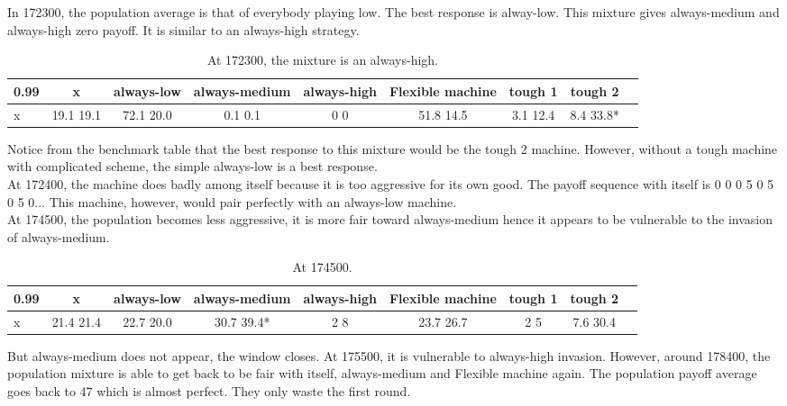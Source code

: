 \documentclass[12.5pt]{report}
\begin{document}
In 172300, the population average is that of everybody playing low. The best response is alway-low. This mixture gives always-medium and always-high zero payoff. It is similar to an always-high strategy. 


\begin{table}[h!]
\center
\begin{tabular}{l|cccccccc}
\textbf{0.99}& x & always-low & always-medium & always-high & Flexible machine &tough 1 & tough 2\\
\hline
x& 19.1 19.1  &    72.1 20.0    &   0.1 0.1  &        0 0   &      51.8 14.5   &   3.1 12.4  &     8.4 33.8* \\
\end{tabular}
\caption{At 172300, the mixture is an always-high.}
\end{table}

Notice from the benchmark table that the best response to this mixture would be the tough 2 machine. However, without a tough machine with complicated scheme, the simple always-low is a best response.\\

At 172400, the machine does badly among itself because it is too aggressive for its own good. The payoff sequence with itself is 0 0 0 5 0 5 0 5 0... This machine, however, would pair perfectly with an always-low machine.\\

At 174500, the population becomes less aggressive, it is more fair toward always-medium hence it appears to be vulnerable to the invasion of always-medium.
\begin{table}[h!]
\center
\begin{tabular}{l|cccccccc}
\textbf{0.99}& x & always-low & always-medium & always-high & Flexible machine &tough 1 & tough 2\\
\hline
x&21.4 21.4 &     22.7 20.0  &    30.7 39.4*   &     2 8    &     23.7 26.7 &        2 5    &     7.6 30.4\\ 
\end{tabular}
\caption{At 174500.}
\end{table}
But always-medium does not appear, the window closes. At 175500, it is vulnerable to always-high invasion. However, around 178400, the population mixture is able to get back to be fair with itself, always-medium and Flexible machine again. The population payoff average goes back to 47 which is almost perfect. They only waste the first round.\\
\end{document}
